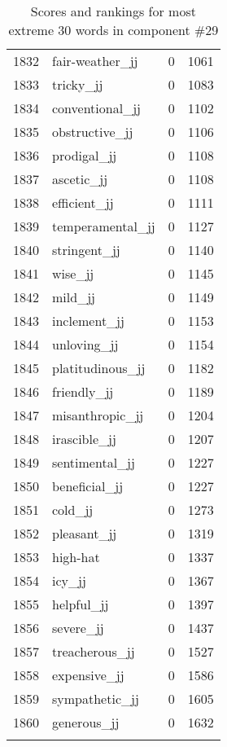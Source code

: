 \begin{longtable}[!htbp]{| rlr@{.}l |}
    1832 & fair-weather\_jj & 0 & 1061 \\
    1833 & tricky\_jj & 0 & 1083 \\
    1834 & conventional\_jj & 0 & 1102 \\
    1835 & obstructive\_jj & 0 & 1106 \\
    1836 & prodigal\_jj & 0 & 1108 \\
    1837 & ascetic\_jj & 0 & 1108 \\
    1838 & efficient\_jj & 0 & 1111 \\
    1839 & temperamental\_jj & 0 & 1127 \\
    1840 & stringent\_jj & 0 & 1140 \\
    1841 & wise\_jj & 0 & 1145 \\
    1842 & mild\_jj & 0 & 1149 \\
    1843 & inclement\_jj & 0 & 1153 \\
    1844 & unloving\_jj & 0 & 1154 \\
    1845 & platitudinous\_jj & 0 & 1182 \\
    1846 & friendly\_jj & 0 & 1189 \\
    1847 & misanthropic\_jj & 0 & 1204 \\
    1848 & irascible\_jj & 0 & 1207 \\
    1849 & sentimental\_jj & 0 & 1227 \\
    1850 & beneficial\_jj & 0 & 1227 \\
    1851 & cold\_jj & 0 & 1273 \\
    1852 & pleasant\_jj & 0 & 1319 \\
    1853 & high-hat & 0 & 1337 \\
    1854 & icy\_jj & 0 & 1367 \\
    1855 & helpful\_jj & 0 & 1397 \\
    1856 & severe\_jj & 0 & 1437 \\
    1857 & treacherous\_jj & 0 & 1527 \\
    1858 & expensive\_jj & 0 & 1586 \\
    1859 & sympathetic\_jj & 0 & 1605 \\
    1860 & generous\_jj & 0 & 1632 \\
    \hline
    \caption{Scores and rankings for most extreme 30 words in component \#29} \\
\end{longtable}
